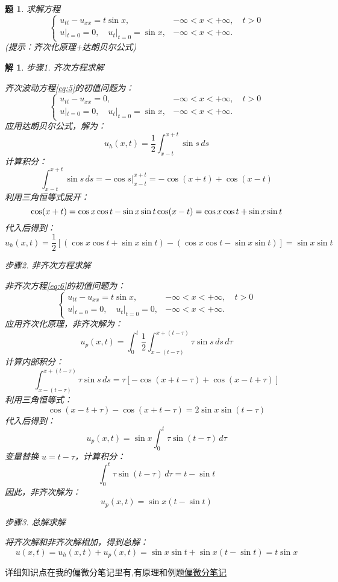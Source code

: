 \documentclass[12pt,a4paper]{article}
\newtheorem{problem}{题}
\newtheorem*{solution}{解}
\begin{document}
\newpage
\begin{problem}
 求解方程
	\[
	\begin{cases}
		u_{tt} - u_{xx} = t\sin x, & -\infty < x < +\infty, \quad t > 0 \\
		u|_{t=0} = 0, \quad u_t|_{t=0} = \sin x, & -\infty < x < +\infty.
	\end{cases}
	\]
	(提示：齐次化原理+达朗贝尔公式)
	
\end{problem}
	
\begin{solution}
	步骤1. 齐次方程求解
	
	\noindent
	齐次波动方程\eqref{eq:5}的初值问题为：
	\begin{equation}\label{eq:5}
	\begin{cases}
		u_{tt} - u_{xx} = 0, & -\infty < x < +\infty, \quad t > 0 \\
		u|_{t=0} = 0, \quad u_t|_{t=0} = \sin x, & -\infty < x < +\infty.
	\end{cases}
		\end{equation}
	应用达朗贝尔公式，解为：
	\[
	u_h(x, t) = \frac{1}{2} \int_{x - t}^{x + t} \sin s \, ds
	\]
	计算积分：
	\[
	\int_{x - t}^{x + t} \sin s \, ds = -\cos s \Big|_{x - t}^{x + t} = -\cos(x + t) + \cos(x - t)
	\]
	利用三角恒等式展开：
	\[
	\cos(x + t) = \cos x \cos t - \sin x \sin t \\
	\cos(x - t) = \cos x \cos t + \sin x \sin t
	\]
	代入后得到：
	\[
	u_h(x, t) = \frac{1}{2} \left[ (\cos x \cos t + \sin x \sin t) - (\cos x \cos t - \sin x \sin t) \right] = \sin x \sin t
	\]
	
	步骤2. 非齐次方程求解
	
	\noindent
	非齐次方程\eqref{eq:6}的初值问题为：
		\begin{equation}\label{eq:6}
	\begin{cases}
		u_{tt} - u_{xx} = t \sin x, & -\infty < x < +\infty, \quad t > 0 \\
		u|_{t=0} = 0, \quad u_t|_{t=0} = 0, & -\infty < x < +\infty.
	\end{cases}
		\end{equation}
	应用齐次化原理，非齐次解为：
	\[
	u_p(x, t) = \int_0^t \frac{1}{2} \int_{x - (t - \tau)}^{x + (t - \tau)} \tau \sin s \, ds \, d\tau
	\]
	计算内部积分：
	\[
	\int_{x - (t - \tau)}^{x + (t - \tau)} \tau \sin s \, ds = \tau \left[ -\cos(x + t - \tau) + \cos(x - t + \tau) \right]
	\]
	利用三角恒等式：
	\[
	\cos(x - t + \tau) - \cos(x + t - \tau) = 2 \sin x \sin(t - \tau)
	\]
	代入后得到：
	\[
	u_p(x, t) = \sin x \int_0^t \tau \sin(t - \tau) \, d\tau
	\]
	变量替换 \(u = t - \tau\)，计算积分：
	\[
	\int_0^t \tau \sin(t - \tau) \, d\tau = t - \sin t
	\]
	因此，非齐次解为：
	\[
	u_p(x, t) = \sin x (t - \sin t)
	\]
	
	步骤3. 总解求解
	
	\noindent
	将齐次解和非齐次解相加，得到总解：
	\[
	u(x, t) = u_h(x, t) + u_p(x, t) = \sin x \sin t + \sin x (t - \sin t) = t \sin x
	\]
	
	
\end{solution}
	详细知识点在我的偏微分笔记里有,有原理和例题\href{https://github.com/Albert-Chen04/Partial-differential-equation}{偏微分笔记}
	
\end{document}
